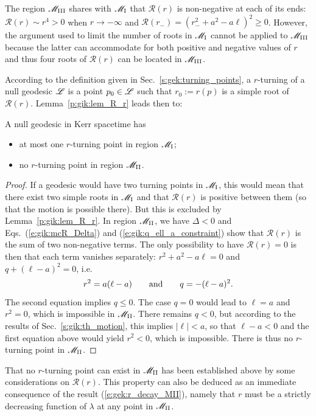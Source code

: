 \begin{remark} \label{r:gik:R_zero_M_III}
The region $\mathscr{M}_{\rm III}$ shares with $\mathscr{M}_{\rm I}$ that $\mathcal{R}(r)$ is
non-negative at each of its ends: $\mathcal{R}(r) \sim r^4 > 0$ when $r\to -\infty$
and $\mathcal{R}(r_-) = (r_-^2 + a^2 - a \ell)^2 \geq 0$. However, the argument
used to limit the number of roots in $\mathscr{M}_{\rm I}$
cannot be applied to $\mathscr{M}_{\rm III}$ because the latter can accommodate for both positive and negative
values of $r$ and thus four roots of $\mathcal{R}(r)$ can be located in $\mathscr{M}_{\rm III}$.
\end{remark}


According to the definition given in Sec.~\ref{s:gek:turning_points},
a $r$-turning of a null geodesic $\mathscr{L}$ is a point $p_0\in \mathscr{L}$
such that $r_0 := r(p)$ is a simple root of $\mathcal{R}(r)$.
Lemma~\ref{p:gik:lem_R_r} leads then to:
\begin{prop}
A null geodesic in Kerr spacetime has
\begin{itemize}
\item at most one $r$-turning point in region $\mathscr{M}_{\rm I}$;
\item no $r$-turning point in region $\mathscr{M}_{\rm II}$.
\end{itemize}
\end{prop}
\begin{proof}
If a geodesic would have two turning points in $\mathscr{M}_{\rm I}$, this would mean
that there exist two simple roots in $\mathscr{M}_{\rm I}$ and that
$\mathcal{R}(r)$ is positive between them (so that the motion is possible
there). But this is excluded by Lemma~\ref{p:gik:lem_R_r}.
In region $\mathscr{M}_{\rm II}$, we have $\Delta < 0$ and
Eqs.~(\ref{e:gik:mcR_Delta}) and (\ref{e:gik:q_ell_a_constraint}) show that
$\mathcal{R}(r)$ is the sum of two non-negative terms. The only possibility
to have $\mathcal{R}(r)=0$ is then that each term vanishes separately:
$r^2 + a^2 - a\ell = 0$ and $q + (\ell -a)^2 = 0$, i.e.
\[
  r^2 = a (\ell - a) \qquad\mbox{and}\qquad q = - (\ell - a)^2 .
\]
The second equation implies $q\leq 0$. The case $q=0$ would lead to $\ell = a$ and $r^2 = 0$,
which is impossible in $\mathscr{M}_{\rm II}$. There remains $q < 0$, but
according to the results of Sec.~\ref{s:gik:th_motion}, this implies $|\ell| < a$, so
that $\ell - a < 0$ and the first equation above would yield $r^2 < 0$, which is impossible.
There is thus no $r$-turning point in $\mathscr{M}_{\rm II}$.
\end{proof}

\begin{remark}
That no $r$-turning point can exist in $\mathscr{M}_{\rm II}$ has been established
above by some considerations on $\mathcal{R}(r)$. This property can also be deduced as
an immediate consequence of the result (\ref{e:gek:r_decay_MII}), namely
that $r$ must be a strictly decreasing function of $\lambda$ at any point
in $\mathscr{M}_{\rm II}$.
\end{remark}

